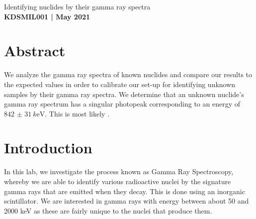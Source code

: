 \documentclass[11pt]{article}
\numberwithin{equation}{section}
\numberwithin{figure}{section}
\numberwithin{table}{section}
\begin{document}
    \begin{center}
        {\huge Identifying nuclides by their gamma ray spectra}\\
        \vspace{0.2in}
        \textbf{KDSMIL001 | May 2021}
        
        \section*{Abstract}\label{sec:Abstract}
        We analyze the gamma ray spectra of known nuclides and compare our results to the expected values in order to calibrate our set-up for identifying unknown samples by their gamma ray spectra. We determine that an unknown nuclide's gamma ray spectrum has a singular photopeak corresponding to an energy of $\SI{842(31)}{k\electronvolt}$. This is most likely .
    \end{center}

    \section{Introduction}\label{sec:Introduction}
    \par In this lab, we investigate the process known as Gamma Ray Spectroscopy, whereby we are able to identify various radioactive nuclei by the signature gamma rays that are emitted when they decay. This is done using an inorganic scintillator. We are interested in gamma rays with energy between about 50 and 2000 keV as these are fairly unique to the nuclei that produce them. 
\end{document}
